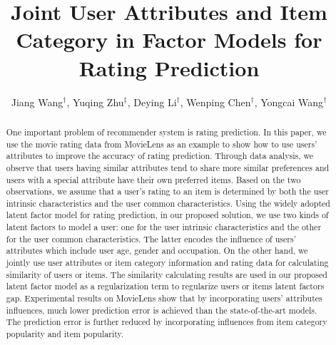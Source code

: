 \documentclass{llncs}
\begin{document}
\frontmatter
\pagestyle{headings}


	\title{Joint User Attributes and Item Category in Factor Models for Rating Prediction}

    \author{Jiang Wang$^{\dag}$, Yuqing Zhu$^{\ddag}$, Deying Li$^{\dag}$, Wenping Chen$^{\dag}$, Yongcai Wang$^{\dag}$}
	\maketitle
	\begin{abstract}
		\noindent One important problem of recommender system is rating prediction.
		In this paper, we use the movie rating data from MovieLens as an example to show how to use users' attributes to
		improve the accuracy of rating prediction.
		Through data analysis, we observe that users having similar attributes tend to share more similar preferences and
		users with a special attribute have their own preferred items.
		Based on the two observations, we assume that a user's rating to an item is determined by both the user intrinsic characteristics and the user
		common characteristics. Using the widely adopted latent factor model for rating prediction,
		in our proposed solution, we use two kinds of latent factors to model a user: one for the user intrinsic characteristics and the
		other for the user common characteristics. The latter encodes the influence of users' attributes which include user age, gender and occupation.
		On the other hand, we jointly use user attributes or item category information and rating data for calculating similarity of users or items.
		The similarity calculating results are used in our proposed latent factor model as a regularization term
		to regularize users or items latent factors gap.
		Experimental results on MovieLens show that by incorporating users' attributes influences,
		much lower prediction error is achieved than the state-of-the-art models.
		The prediction error is further reduced by incorporating influences from item category popularity and item popularity.
		
	\end{abstract}
%	
	
\end{document}
